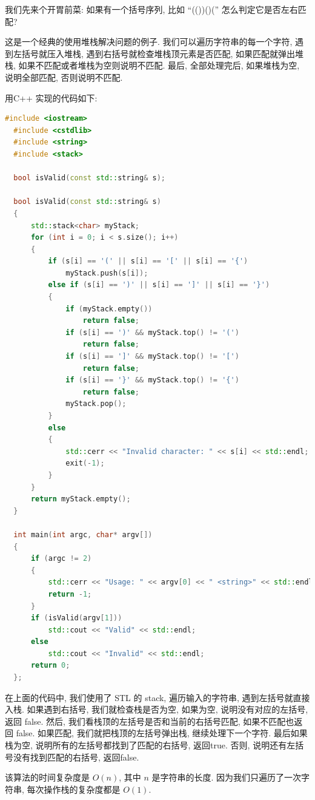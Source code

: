 \documentclass[a4paper]{ctexart}
\theoremstyle{definition}
\theoremstyle{definition}
\begin{document}
我们先来个开胃前菜: 如果有一个括号序列, 比如 ``(())()('' 怎么判定它是否左右匹配? 

这是一个经典的使用堆栈解决问题的例子. 我们可以遍历字符串的每一个字符, 遇到左括号就压入堆栈, 
遇到右括号就检查堆栈顶元素是否匹配, 如果匹配就弹出堆栈, 如果不匹配或者堆栈为空则说明不匹配. 
最后, 全部处理完后, 如果堆栈为空, 说明全部匹配, 否则说明不匹配.

用C++ 实现的代码如下:

\begin{lstlisting}[language=C++]
  #include <iostream>
  #include <cstdlib>
  #include <string>
  #include <stack>
  
  bool isValid(const std::string& s);
  
  bool isValid(const std::string& s) 
  {
      std::stack<char> myStack;
      for (int i = 0; i < s.size(); i++) 
      {
          if (s[i] == '(' || s[i] == '[' || s[i] == '{') 
              myStack.push(s[i]);
          else if (s[i] == ')' || s[i] == ']' || s[i] == '}')
          {
              if (myStack.empty()) 
                  return false;
              if (s[i] == ')' && myStack.top() != '(') 
                  return false;
              if (s[i] == ']' && myStack.top() != '[') 
                  return false;
              if (s[i] == '}' && myStack.top() != '{') 
                  return false;
              myStack.pop();
          }
          else
          {
              std::cerr << "Invalid character: " << s[i] << std::endl;
              exit(-1);
          }
      }
      return myStack.empty();
  }    
  
  int main(int argc, char* argv[])
  {
      if (argc != 2) 
      {
          std::cerr << "Usage: " << argv[0] << " <string>" << std::endl;
          return -1;
      }
      if (isValid(argv[1]))
          std::cout << "Valid" << std::endl;
      else
          std::cout << "Invalid" << std::endl;
      return 0;    
  };   
\end{lstlisting}

在上面的代码中, 我们使用了 STL 的 stack, 遍历输入的字符串, 遇到左括号就直接入栈. 
如果遇到右括号, 我们就检查栈是否为空, 如果为空, 说明没有对应的左括号, 返回 false. 
然后, 我们看栈顶的左括号是否和当前的右括号匹配, 如果不匹配也返回 false. 如果匹配, 
我们就把栈顶的左括号弹出栈, 继续处理下一个字符. 最后如果栈为空, 
说明所有的左括号都找到了匹配的右括号, 返回true. 否则, 说明还有左括号没有找到匹配的右括号, 
返回false. 

该算法的时间复杂度是 $O(n)$, 其中 $n$ 是字符串的长度. 因为我们只遍历了一次字符串, 
每次操作栈的复杂度都是 $O(1)$.
\end{document}

